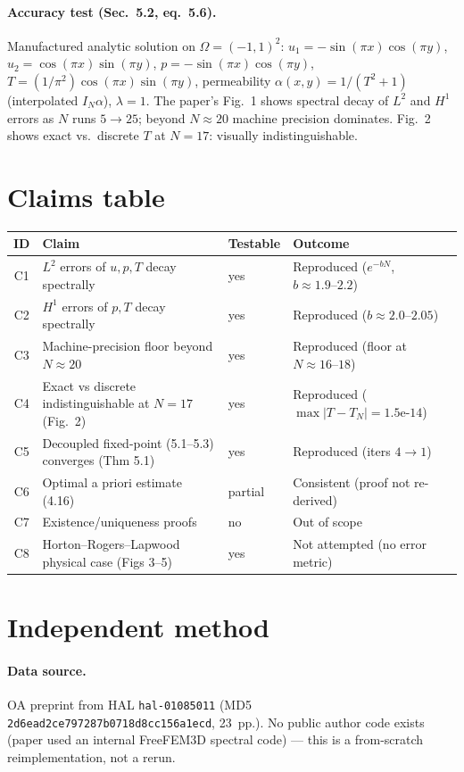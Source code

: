 \documentclass[11pt]{article}
\begin{document}
\paragraph{Accuracy test (Sec.~5.2, eq.~5.6).}
Manufactured analytic solution on $\Omega=(-1,1)^2$:
$u_1=-\sin(\pi x)\cos(\pi y)$, $u_2=\cos(\pi x)\sin(\pi y)$, $p=-\sin(\pi x)\cos(\pi y)$,
$T=(1/\pi^2)\cos(\pi x)\sin(\pi y)$, permeability $\alpha(x,y)=1/(T^2+1)$ (interpolated $I_N\alpha$),
$\lambda=1$. The paper's Fig.~1 shows spectral decay of $L^2$ and $H^1$ errors as $N$ runs
$5\to 25$; beyond $N\!\approx\!20$ machine precision dominates. Fig.~2 shows exact vs.\ discrete $T$
at $N=17$: visually indistinguishable.

\section{Claims table}
\begin{center}
\small
\begin{tabular}{clll}
\toprule
ID & Claim & Testable & Outcome \\
\midrule
C1 & $L^2$ errors of $u,p,T$ decay spectrally & yes & Reproduced ($e^{-bN}$, $b\!\approx\!1.9\text{--}2.2$) \\
C2 & $H^1$ errors of $p,T$ decay spectrally  & yes & Reproduced ($b\!\approx\!2.0\text{--}2.05$) \\
C3 & Machine-precision floor beyond $N\!\approx\!20$ & yes & Reproduced (floor at $N\!\approx\!16\text{--}18$) \\
C4 & Exact vs discrete indistinguishable at $N=17$ (Fig.~2) & yes & Reproduced ($\max|T-T_N|=1.5\text{e-}14$) \\
C5 & Decoupled fixed-point (5.1--5.3) converges (Thm 5.1) & yes & Reproduced (iters $4\to 1$) \\
C6 & Optimal a priori estimate (4.16) & partial & Consistent (proof not re-derived) \\
C7 & Existence/uniqueness proofs & no & Out of scope \\
C8 & Horton--Rogers--Lapwood physical case (Figs 3--5) & yes & Not attempted (no error metric) \\
\bottomrule
\end{tabular}
\end{center}

\section{Independent method}
\label{sec:method}
\paragraph{Data source.} OA preprint from HAL \texttt{hal-01085011}
(MD5 \texttt{2d6ead2ce797287b0718d8cc156a1ecd}, 23~pp.). No public author code exists (paper used
an internal FreeFEM3D spectral code) --- this is a from-scratch reimplementation, not a rerun.
\end{document}
